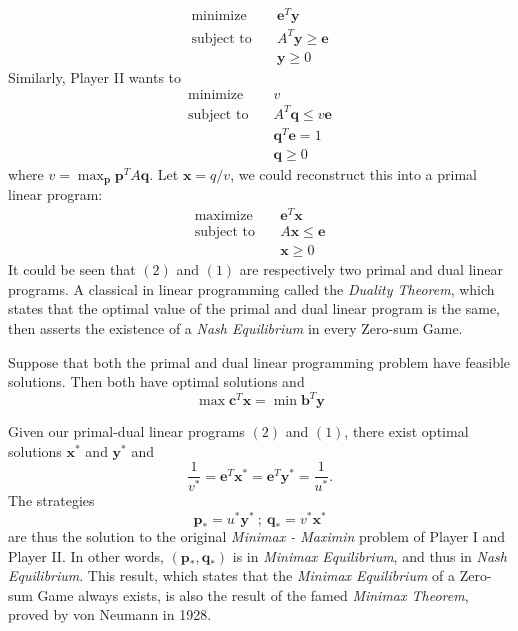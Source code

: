 \documentclass[journal, 11pt, a4paper, twoside]{IEEEtran}
\begin{document}
                \begin{equation}
                \begin{aligned}
                \text{minimize} & \quad \bm{e}^{T}\bm{y} \\
                \text{subject to} & \quad A^{T}\bm{y} \geq \bm{e}\\
                & \quad \bm{y} \geq 0
                \end{aligned}  
                \end{equation}
    Similarly, Player II wants to 
    \begin{align*}
        \text{minimize}& \quad v\\
        \text{subject to}& \quad A^T\bm{q} \leq v \bm{e}\\
        & \quad \bm{q}^T\bm{e} = 1\\
        & \quad \bm{q} \geq 0
    \end{align*}
    where $v = \max_{\bm{p}}\bm{p}^TA\bm{q}.$
    Let $\bm{x} = q/v$, we could reconstruct this into a primal linear program:  
        \begin{equation}
        \begin{aligned}
                \text{maximize} & \quad \bm{e}^{T}\bm{x} \\
                \text{subject to} & \quad A\bm{x} \leq \bm{e}\\
                & \quad \bm{x} \geq 0
        \end{aligned}            
        \end{equation}
    It could be seen that $(2)$ and $(1)$ are respectively two primal and dual linear programs. A classical in linear programming called the \textit{Duality Theorem}, which states that the optimal value of the primal and dual linear program is the same, then asserts the existence of a \textit{Nash Equilibrium} in every Zero-sum Game.
\begin{theorem}
    Suppose that both the primal and dual linear programming problem have feasible solutions. Then both have optimal solutions and 
    \[
    \max \bm{c}^T\bm{x} = \min \bm{b}^T\bm{y}
    \]
\end{theorem}
\noindent Given our primal-dual linear programs $(2)$ and $(1)$, there exist optimal solutions $\bm{x^*}$ and $\bm{y}^*$ and 
    \[
    \frac{1}{v^*} = \bm{e}^T\bm{x}^* = \bm{e}^T\bm{y}^* = \frac{1}{u^*}.
    \]
The strategies 
\[
\bm{p}_* = u^*\bm{y}^* \ ; \ \bm{q}_* = v^*\bm{x}^*
\]
are thus the solution to the original \textit{Minimax - Maximin} problem of Player I and Player II. In other words, $(\bm{p}_*, \bm{q}_*)$ is in \textit{Minimax Equilibrium}, and thus in \textit{Nash Equilibrium}. This result, which states that the \textit{Minimax Equilibrium} of a Zero-sum Game always exists, is also the result of the famed \textit{Minimax Theorem}, proved by von Neumann in 1928.
\end{document}
